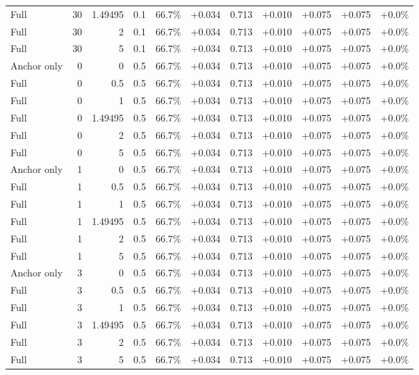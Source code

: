 \begin{table}[htbp]
\begin{tabular}{lrrrccccccc}
Full & 30 & 1.49495 & 0.1 & 66.7\% & +0.034 & 0.713 & +0.010 & +0.075 & +0.075 & +0.0\% \\
Full & 30 & 2 & 0.1 & 66.7\% & +0.034 & 0.713 & +0.010 & +0.075 & +0.075 & +0.0\% \\
Full & 30 & 5 & 0.1 & 66.7\% & +0.034 & 0.713 & +0.010 & +0.075 & +0.075 & +0.0\% \\
Anchor only & 0 & 0 & 0.5 & 66.7\% & +0.034 & 0.713 & +0.010 & +0.075 & +0.075 & +0.0\% \\
Full & 0 & 0.5 & 0.5 & 66.7\% & +0.034 & 0.713 & +0.010 & +0.075 & +0.075 & +0.0\% \\
Full & 0 & 1 & 0.5 & 66.7\% & +0.034 & 0.713 & +0.010 & +0.075 & +0.075 & +0.0\% \\
Full & 0 & 1.49495 & 0.5 & 66.7\% & +0.034 & 0.713 & +0.010 & +0.075 & +0.075 & +0.0\% \\
Full & 0 & 2 & 0.5 & 66.7\% & +0.034 & 0.713 & +0.010 & +0.075 & +0.075 & +0.0\% \\
Full & 0 & 5 & 0.5 & 66.7\% & +0.034 & 0.713 & +0.010 & +0.075 & +0.075 & +0.0\% \\
Anchor only & 1 & 0 & 0.5 & 66.7\% & +0.034 & 0.713 & +0.010 & +0.075 & +0.075 & +0.0\% \\
Full & 1 & 0.5 & 0.5 & 66.7\% & +0.034 & 0.713 & +0.010 & +0.075 & +0.075 & +0.0\% \\
Full & 1 & 1 & 0.5 & 66.7\% & +0.034 & 0.713 & +0.010 & +0.075 & +0.075 & +0.0\% \\
Full & 1 & 1.49495 & 0.5 & 66.7\% & +0.034 & 0.713 & +0.010 & +0.075 & +0.075 & +0.0\% \\
Full & 1 & 2 & 0.5 & 66.7\% & +0.034 & 0.713 & +0.010 & +0.075 & +0.075 & +0.0\% \\
Full & 1 & 5 & 0.5 & 66.7\% & +0.034 & 0.713 & +0.010 & +0.075 & +0.075 & +0.0\% \\
Anchor only & 3 & 0 & 0.5 & 66.7\% & +0.034 & 0.713 & +0.010 & +0.075 & +0.075 & +0.0\% \\
Full & 3 & 0.5 & 0.5 & 66.7\% & +0.034 & 0.713 & +0.010 & +0.075 & +0.075 & +0.0\% \\
Full & 3 & 1 & 0.5 & 66.7\% & +0.034 & 0.713 & +0.010 & +0.075 & +0.075 & +0.0\% \\
Full & 3 & 1.49495 & 0.5 & 66.7\% & +0.034 & 0.713 & +0.010 & +0.075 & +0.075 & +0.0\% \\
Full & 3 & 2 & 0.5 & 66.7\% & +0.034 & 0.713 & +0.010 & +0.075 & +0.075 & +0.0\% \\
Full & 3 & 5 & 0.5 & 66.7\% & +0.034 & 0.713 & +0.010 & +0.075 & +0.075 & +0.0\% \\

\end{tabular}
\end{table}
